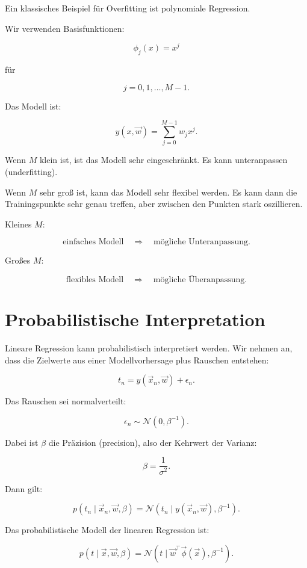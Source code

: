 Ein klassisches Beispiel für Overfitting ist polynomiale Regression.

Wir verwenden Basisfunktionen:

\[
    \phi_j(x)=x^j
\]

für

\[
    j=0,1,\dots,M-1.
\]

Das Modell ist:

\[
    y(x,\vec{w})
    =
    \sum_{j=0}^{M-1}
    w_jx^j.
\]

Wenn \(M\) klein ist, ist das Modell sehr eingeschränkt.
Es kann unteranpassen (underfitting).

Wenn \(M\) sehr groß ist, kann das Modell sehr flexibel werden.
Es kann dann die Trainingspunkte sehr genau treffen, aber zwischen den Punkten stark oszillieren.

\begin{conceptbox}
Kleines \(M\):

\[
    \text{einfaches Modell}
    \quad
    \Rightarrow
    \quad
    \text{mögliche Unteranpassung}.
\]

Großes \(M\):

\[
    \text{flexibles Modell}
    \quad
    \Rightarrow
    \quad
    \text{mögliche Überanpassung}.
\]
\end{conceptbox}

\section{Probabilistische Interpretation}

Lineare Regression kann probabilistisch interpretiert werden.
Wir nehmen an, dass die Zielwerte aus einer Modellvorhersage plus Rauschen entstehen:

\[
    t_n
    =
    y(\vec{x}_n,\vec{w})
    +
    \epsilon_n.
\]

Das Rauschen sei normalverteilt:

\[
    \epsilon_n
    \sim
    \mathcal{N}(0,\beta^{-1}).
\]

Dabei ist \(\beta\) die Präzision (precision), also der Kehrwert der Varianz:

\[
    \beta
    =
    \frac{1}{\sigma^2}.
\]

Dann gilt:

\[
    p(t_n \mid \vec{x}_n,\vec{w},\beta)
    =
    \mathcal{N}
    \left(
        t_n
        \mid
        y(\vec{x}_n,\vec{w}),
        \beta^{-1}
    \right).
\]

\begin{definitionbox}
Das probabilistische Modell der linearen Regression ist:

\[
    p(t \mid \vec{x},\vec{w},\beta)
    =
    \mathcal{N}
    \left(
        t
        \mid
        \vec{w}^{\top}\vec{\phi}(\vec{x}),
        \beta^{-1}
    \right).
\]
\end{definitionbox}

